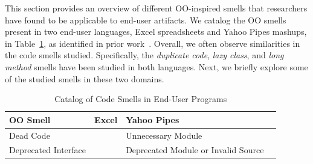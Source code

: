 \documentclass{sig-alternate}
\renewcommand*\cmidrule{\midrule[0.001em]} %
\begin{document}
This section provides an overview of different OO-inspired smells that researchers have found to be applicable to end-user artifacts. 
 We catalog the OO smells present in two end-user languages, Excel spreadsheets and Yahoo Pipes mashups, in Table~\ref{table:oosmellslarge}, as identified in prior work~\cite{Stolee2011,StoleeTSE2013,Hermans2012intra, Hermans2012inter}.
 Overall, we often observe similarities in the code smells studied. Specifically, the \emph{duplicate code}, \emph{lazy class}, and \emph{long method} smells  have been studied in both languages. 
Next, we briefly explore some of the studied smells in these two domains. 



\begin{table}
\begin{small}
\begin{center}
\caption{Catalog of Code Smells in End-User Programs
\label{table:oosmellslarge}}
\sffamily
\begin{tabular} {@{}llll@{}}
\toprule
\textbf{OO Smell}
	& \textbf{Excel}
	& \textbf{Yahoo Pipes}
\\ \midrule
Dead Code
	& %
	& Unnecessary Module \cite{StoleeTSE2013}
\\ \cmidrule
Deprecated Interface
	& %
	& Deprecated Module or Invalid Source \cite{StoleeTSE2013}


\end{tabular}
\end{center}
\end{small}
\end{table}
\end{document}
